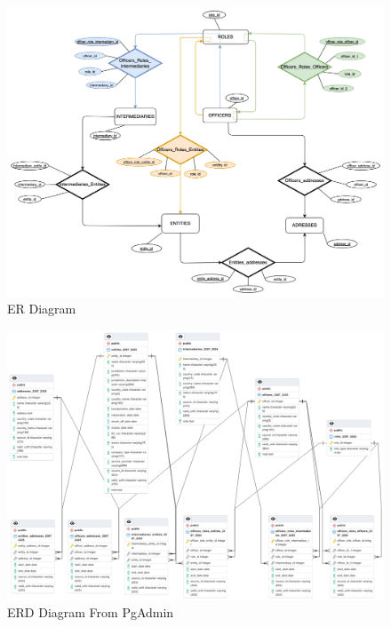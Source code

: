 \documentclass{article}
\begin{document}
\begin{figure}[h]
    \centering
    \includegraphics[width=\textwidth]{er.png}
    \caption{ER Diagram}
    \label{fig:er-diagram}
\end{figure}

\newpage

\begin{figure}[h]
    \centering
    \includegraphics[width=\textwidth]{pgadmin_ed.png}
    \caption{ERD Diagram From PgAdmin}
    \label{fig:erd_pgadmin-diagram}
\end{figure}
\end{document}
